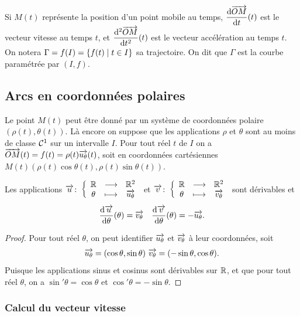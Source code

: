 Si \(M(t)\) représente la position d'un point mobile au temps, 
\(\dfrac{\mathrm{d} \overrightarrow{OM}}{\mathrm{d} t}(t)\) est le vecteur vitesse au temps \(t\), et 
\(\dfrac{\mathrm{d}^2 \overrightarrow{OM}}{\mathrm{d} {t}^2}(t)\) est le vecteur accélération au temps \(t\). On 
notera \(\Gamma = f(I)=\left\{f(t)\mathrel{}\middle|\mathrel{}t \in I\right\}\) sa trajectoire. On dit que 
\(\Gamma\) est la courbe paramétrée par \((I, f)\).

\subsection{Arcs en coordonnées polaires}

Le point \(M(t)\) peut être donné par un système de coordonnées polaire 
\((\rho(t), \theta(t))\). Là encore on suppose que les applications \(\rho\) et 
\(\theta\) sont au moins de classe \(\mathcal{C}^{1}\) sur un intervalle \(I\). Pour 
tout réel \(t\) de \(I\) on a \(\overrightarrow{OM}(t)=f(t)=\rho(t)\overrightarrow{u_\theta}(t)\), 
soit en coordonnées cartésiennes \(M(t)(\rho(t)\cos\theta(t), 
\rho(t)\sin\theta(t))\).

\begin{prop}
  Les applications \(\overrightarrow{u}\colon \left\{\begin{array}{ccc} \mathbb{R} & \longrightarrow &\mathbb{R}^2\\ \theta & \longmapsto & \overrightarrow{u_\theta} \end{array} \right.\) et 
  \(\overrightarrow{v}\colon \left\{\begin{array}{ccc} \mathbb{R} & \longrightarrow &\mathbb{R}^2\\ \theta & \longmapsto & \overrightarrow{v_\theta} \end{array} \right.\) sont dérivables et
  \begin{equation}
    \dfrac{\mathrm{d} \overrightarrow{u}}{\mathrm{d} \theta}(\theta) = \overrightarrow{v_\theta} \quad 
    \dfrac{\mathrm{d} \overrightarrow{v}}{\mathrm{d} \theta}(\theta) = -\overrightarrow{u_\theta}.
  \end{equation}
\end{prop}

\begin{proof}
  Pour tout réel \(\theta\), on peut identifier \(\overrightarrow{u_\theta}\) et 
  \(\overrightarrow{v_\theta}\) à leur coordonnées, soit
  \begin{equation}
    \overrightarrow{u_\theta} = (\cos \theta, \sin \theta) \ \overrightarrow{v_{\theta}} = (-\sin 
    \theta, \cos \theta).
  \end{equation}
  Puisque les applications sinus et cosinus sont dérivables sur \(\mathbb{R}\), et que 
  pour tout réel \(\theta\), on a \(\sin' \theta = \cos \theta\) et \(\cos' 
  \theta = -\sin \theta\).
\end{proof}

\subsubsection{Calcul du vecteur vitesse}

